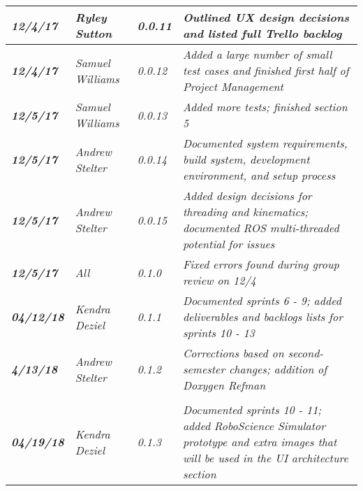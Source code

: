 \begin{tabular}{|>{\raggedright}p{1.5cm}|>{\raggedright}p{3cm}|>{\raggedright}p{1.5cm}|>{\raggedright}p{9cm}|}
\hline
\textit{\textbf{12/4/17}} & \textit{Ryley Sutton} & \textit{0.0.11} & \textit{Outlined UX design decisions and listed full Trello backlog}\tabularnewline
\hline
\textit{\textbf{12/4/17}} & \textit{Samuel Williams} & \textit{0.0.12} & \textit{Added a large number of small test cases and finished first half of Project Management}\tabularnewline
\hline
\textit{\textbf{12/5/17}} & \textit{Samuel Williams} & \textit{0.0.13} & \textit{Added more tests; finished section 5}\tabularnewline
\hline
\textit{\textbf{12/5/17}} & \textit{Andrew Stelter} & \textit{0.0.14} & \textit{Documented system requirements, build system, development environment, and setup process}\tabularnewline
\hline
\textit{\textbf{12/5/17}} & \textit{Andrew Stelter} & \textit{0.0.15} & \textit{Added design decisions for threading and kinematics; documented ROS multi-threaded potential for issues}\tabularnewline
\hline
\textit{\textbf{12/5/17}} & \textit{All} & \textit{0.1.0} & \textit{Fixed errors found during group review on 12/4}\tabularnewline
\hline
\textit{\textbf{04/12/18}} & \textit{Kendra Deziel} & \textit{0.1.1} & \textit{Documented sprints 6 - 9; added deliverables and backlogs lists for sprints 10 - 13}\tabularnewline
\hline
\textit{\textbf{4/13/18}} & \textit{Andrew Stelter} & \textit{0.1.2} & \textit{Corrections based on second-semester changes; addition of Doxygen Refman}\tabularnewline \tabularnewline
\hline
\textit{\textbf{04/19/18}} & \textit{Kendra Deziel} & \textit{0.1.3} & \textit{Documented sprints 10 - 11; added RoboScience Simulator prototype and extra images that will be used in the UI architecture section}\tabularnewline
\hline
\end{tabular}
\vfill

